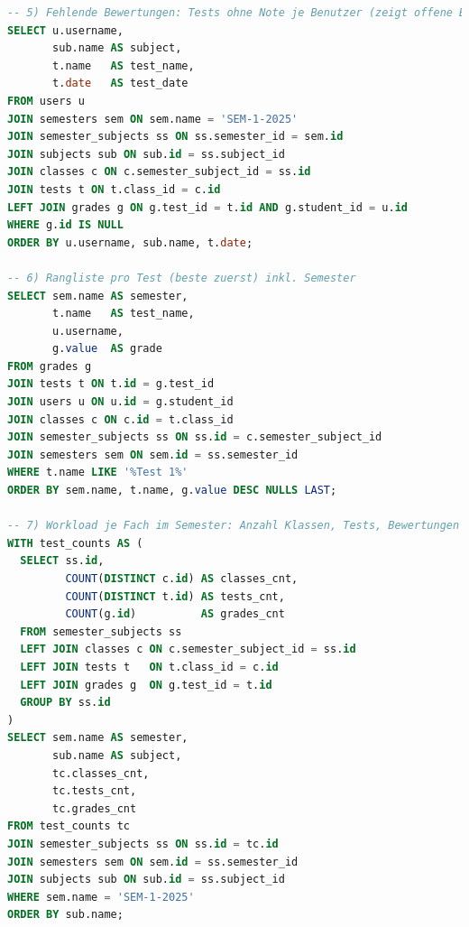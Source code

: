 \documentclass[12pt,a4paper]{article}
\begin{document}
\begin{lstlisting}[language=SQL]
-- 5) Fehlende Bewertungen: Tests ohne Note je Benutzer (zeigt offene Bewertungen)
SELECT u.username,
       sub.name AS subject,
       t.name   AS test_name,
       t.date   AS test_date
FROM users u
JOIN semesters sem ON sem.name = 'SEM-1-2025'
JOIN semester_subjects ss ON ss.semester_id = sem.id
JOIN subjects sub ON sub.id = ss.subject_id
JOIN classes c ON c.semester_subject_id = ss.id
JOIN tests t ON t.class_id = c.id
LEFT JOIN grades g ON g.test_id = t.id AND g.student_id = u.id
WHERE g.id IS NULL
ORDER BY u.username, sub.name, t.date;

-- 6) Rangliste pro Test (beste zuerst) inkl. Semester
SELECT sem.name AS semester,
       t.name   AS test_name,
       u.username,
       g.value  AS grade
FROM grades g
JOIN tests t ON t.id = g.test_id
JOIN users u ON u.id = g.student_id
JOIN classes c ON c.id = t.class_id
JOIN semester_subjects ss ON ss.id = c.semester_subject_id
JOIN semesters sem ON sem.id = ss.semester_id
WHERE t.name LIKE '%Test 1%'
ORDER BY sem.name, t.name, g.value DESC NULLS LAST;

-- 7) Workload je Fach im Semester: Anzahl Klassen, Tests, Bewertungen
WITH test_counts AS (
  SELECT ss.id,
         COUNT(DISTINCT c.id) AS classes_cnt,
         COUNT(DISTINCT t.id) AS tests_cnt,
         COUNT(g.id)          AS grades_cnt
  FROM semester_subjects ss
  LEFT JOIN classes c ON c.semester_subject_id = ss.id
  LEFT JOIN tests t   ON t.class_id = c.id
  LEFT JOIN grades g  ON g.test_id = t.id
  GROUP BY ss.id
)
SELECT sem.name AS semester,
       sub.name AS subject,
       tc.classes_cnt,
       tc.tests_cnt,
       tc.grades_cnt
FROM test_counts tc
JOIN semester_subjects ss ON ss.id = tc.id
JOIN semesters sem ON sem.id = ss.semester_id
JOIN subjects sub ON sub.id = ss.subject_id
WHERE sem.name = 'SEM-1-2025'
ORDER BY sub.name;
    \end{lstlisting}
\end{document}
